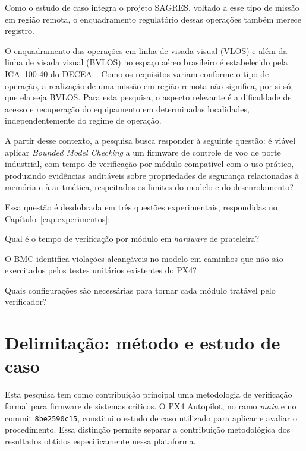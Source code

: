 Como o estudo de caso integra o projeto SAGRES, voltado a esse tipo de missão em região remota, o enquadramento regulatório dessas operações também merece registro.

O enquadramento das operações em linha de visada visual (VLOS) e além da linha de visada visual (BVLOS) no espaço aéreo brasileiro é estabelecido pela ICA~100-40 do DECEA~\cite{DECEA_ICA10040}. Como os requisitos variam conforme o tipo de operação, a realização de uma missão em região remota não significa, por si só, que ela seja BVLOS. Para esta pesquisa, o aspecto relevante é a dificuldade de acesso e recuperação do equipamento em determinadas localidades, independentemente do regime de operação.

A partir desse contexto, a pesquisa busca responder à seguinte questão: é viável aplicar \textit{Bounded Model Checking} a um firmware de controle de voo de porte industrial, com tempo de verificação por módulo compatível com o uso prático, produzindo evidências auditáveis sobre propriedades de segurança relacionadas à memória e à aritmética, respeitados os limites do modelo e do desenrolamento?

Essa questão é desdobrada em três questões experimentais, respondidas no Capítulo~\ref{cap:experimentos}:

\begin{description}[leftmargin=1.5cm, style=nextline]
\item[\textbf{QE1}] Qual é o tempo de verificação por módulo em \textit{hardware} de prateleira?

\item[\textbf{QE2}] O BMC identifica violações alcançáveis no modelo em caminhos que não são exercitados pelos testes unitários existentes do PX4?

\item[\textbf{QE3}] Quais configurações são necessárias para tornar cada módulo tratável pelo verificador?
\end{description}

\section{Delimitação: método e estudo de caso}
\label{sec:delimitacao}

Esta pesquisa tem como contribuição principal uma metodologia de verificação formal para firmware de sistemas críticos. O PX4 Autopilot, no ramo \textit{main} e no commit \texttt{8be2590c15}, constitui o estudo de caso utilizado para aplicar e avaliar o procedimento. Essa distinção permite separar a contribuição metodológica dos resultados obtidos especificamente nessa plataforma.

